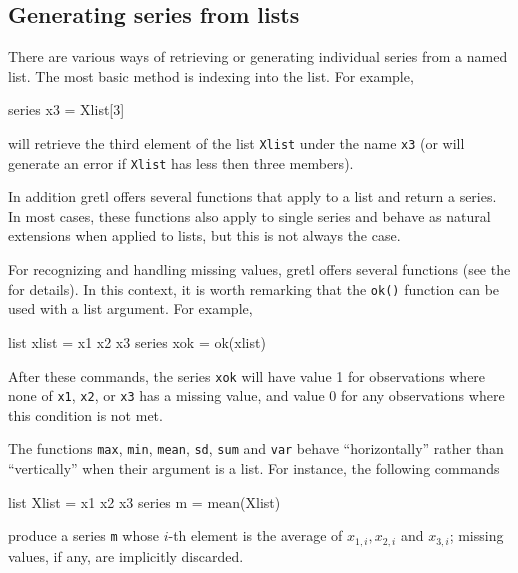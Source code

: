 \subsection{Generating series from lists}

There are various ways of retrieving or generating individual series
from a named list. The most basic method is indexing into the
list. For example,
%
\begin{code}
series x3 = Xlist[3]
\end{code}
%
will retrieve the third element of the list \texttt{Xlist} under the
name \texttt{x3} (or will generate an error if \texttt{Xlist} has less
then three members).

In addition gretl offers several functions that apply to a list and
return a series.  In most cases, these functions also apply to single
series and behave as natural extensions when applied to lists, but
this is not always the case.

For recognizing and handling missing values, gretl offers
several functions (see the \GCR{} for details). In this context, it is
worth remarking that the \texttt{ok()} function can be used with a
list argument.  For example,
%
\begin{code}
list xlist = x1 x2 x3
series xok = ok(xlist)
\end{code}
%
After these commands, the series \texttt{xok} will have value 1 for
observations where none of \texttt{x1}, \texttt{x2}, or
\texttt{x3} has a missing value, and value 0 for any observations
where this condition is not met.

The functions \texttt{max}, \texttt{min}, \texttt{mean}, \texttt{sd},
\texttt{sum} and \texttt{var} behave ``horizontally'' rather than
``vertically'' when their argument is a list. For instance, the
following commands
\begin{code}
  list Xlist = x1 x2 x3
  series m = mean(Xlist)
\end{code}
produce a series \texttt{m} whose $i$-th element is the average of
$x_{1,i}, x_{2,i}$ and $x_{3,i}$; missing values, if any, are implicitly discarded.

